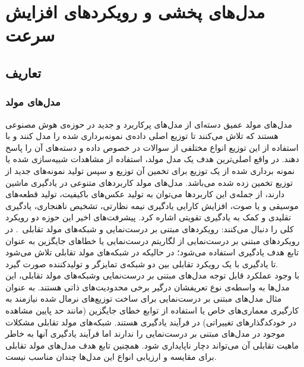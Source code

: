 \chapter{مدل‌های پخشی و رویکرد‌های افزایش سرعت}
\section{تعاریف}
\subsection{مدل‌های مولد}

مدل‌های مولد عمیق دسته‌ای از مدل‌های پرکاربرد و جدید در حوزه‌ی هوش مصنوعی هستند که تلاش می‌کنند تا توزیع اصلی داده‌ی نمونه‌برداری شده را مدل کنند و با استفاده از این توزیع انواع مختلفی از سوالات در خصوص داده و دسته‌های آن را پاسخ دهند. در واقع اصلی‌ترین هدف یک مدل مولد، استفاده از مشاهدات شبیه‌سازی شده یا نمونه برداری شده از یک توزیع برای تخمین آن توزیع و سپس تولید نمونه‌های جدید از توزیع تخمین زده شده می‌باشد.
مدل‌های مولد کاربردهای متنوعی در یادگیری ماشین دارند، از جمله‌ی این کاربردها می‌توان به تولید عکس‌های باکیفیت، تولید قطعه‌های موسیقی و یا صوت، افزایش کارایی یادگیری نیمه نظارتی، تشخیص ناهنجاری، یادگیری تقلیدی و کمک به یادگیری تقویتی اشاره کرد. پیشرفت‌های اخیر این حوزه دو رویکرد کلی را دنبال می‌کنند: رویکردهای مبتنی بر درست‌نمایی و شبکه‌های مولد تقابلی \cite{song2019generative}. در رویکردهای مبتنی بر درست‌نمایی از لگاریتم درست‌نمایی یا خطاهای جایگزین به عنوان تابع هدف یادگیری استفاده می‌شود؛ در حالیکه در شبکه‌های مولد تقابلی تلاش می‌شود تا یادگیری با یک رویکرد تقابلی بین دو شبکه‌ی تمایزگر و تولیدکننده صورت گیرد.
\\
با وجود عملکرد قابل توجه مدل‌های مبتنی بر درست‌نمایی وشبکه‌های مولد تقابلی، این مدل‌ها به واسطه‌ی نوع تعریفشان درگیر برخی محدودیت‌های ذاتی هستند. به عنوان مثال مدل‌های مبتنی بر درست‌نمایی برای ساخت توزیع‌های نرمال شده نیازمند به کارگیری معماری‌های خاص یا استفاده از توابع خطای جایگزین (مانند حد پایین مشاهده در خودکدگذارهای تغییراتی) در فرآیند یادگیری هستند. شبکه‌های مولد تقابلی مشکلات موجود در مدل‌های مبتنی بر درست‌نمایی را ندارند اما فرآیند یادگیری آنها به خاطر ماهیت تقابلی آن می‌تواند دچار ناپایداری شود. همچنین تابع هدف مدل‌های مولد تقابلی برای مقایسه و ارزیابی انواع این مدل‌ها چندان مناسب نیست\cite{song2019generative}.


